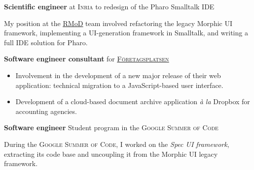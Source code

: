 \begin{rubric}{%
}
\textbf{Scientific engineer} at \textsc{Inria} to redesign of the Pharo
Smalltalk IDE

\mbox{}

My position at the \href{http://rmod.inria.fr/}{\underline{RMoD}} team involved
refactoring the legacy Morphic UI framework, implementing a UI-generation
framework in Smalltalk, and writing a full IDE solution for Pharo.





 \textbf{Software engineer consultant} for \href{http://www.foretagsplatsen.se/}{\underline{\textsc{Företagsplatsen}}}

\begin{itemize}
\item Involvement in the development of a new major release of their web
  application: technical migration to a JavaScript-based user interface.
\item Development of a cloud-based document archive application \emph{à la} Dropbox for
  accounting agencies.
\end{itemize}

 \textbf{Software engineer} Student program in the \textsc{Google Summer of Code}

\mbox{}

During the \textsc{Google Summer of Code}, I worked on the \emph{Spec UI
  framework}, extracting its code base and uncoupling it from the Morphic UI
legacy framework.



\end{rubric}
